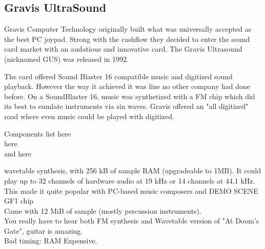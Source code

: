 \subsection{Gravis UltraSound}
Gravis Computer Technology originally built what was universally accepted as the best PC joypad. Strong with the cashflow they decided to enter the sound card market with an audatious and innovative card. The Gravis Ultrasound (nicknamed GUS) was released in 1992.\\
\par
The card offered Sound Blaster 16 compatible music and digitized sound playback. However the way it achieved it was line no other company had done before. On a SoundBlaster 16, music was synthetized with a FM chip which did its best to eumlate instruments via sin waves. Gravis offered an "all digitized" road where even music could be played with digitized.\\
\par
{}
\par
Components list here\\
here\\
and here\\
\par
wavetable synthesis, with 256 kB of sample RAM (upgradeable to 1MB). It could play up to 32 channels of hardware audio at 19 kHz or 14 channels at 44.1 kHz. This made it quite popular with PC-based music composers and DEMO SCENE\\
GF1 chip\\
Came with 12 MiB of sample (mostly percussion instruments).\\
You really have to hear both FM synthesis and Wavetable version of "At Doom's Gate", guitar is amazing.\\
Bad timing: RAM Expensive.\\